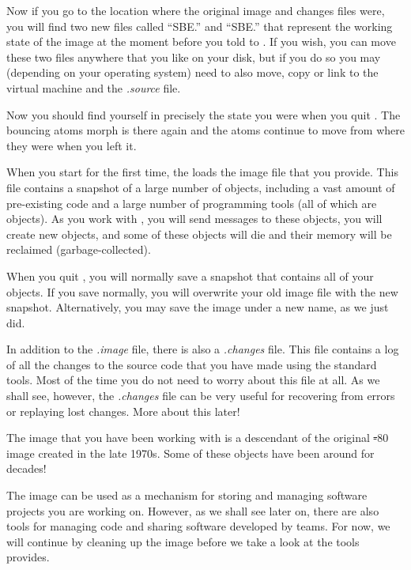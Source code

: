 \documentclass[a4paper,10pt,twoside]{book}
\begin{document}

Now if you go to the location where the original image and changes files were, you will find two new files called ``SBE.'' and ``SBE.'' that represent the working state of the \sq image at the moment before you told \sq to .
If you wish, you can move these two files anywhere that you like on your disk, but if you do so you may (depending on your operating system) need to also move, copy or link to the virtual machine and the \emph{.source} file.


Now you should find yourself in precisely the state you were when you quit \sq.
The bouncing atoms morph is there again and the atoms continue to move from where they were when you left it.

When you start \sq for the first time, the \sq {} loads the image file that you provide.
This file contains a snapshot of a large number of objects, including a vast amount of pre-existing code and a large number of programming tools (all of which are objects).
As you work with \sq, you will send messages to these objects, you will create new objects, and some of these objects will die and their memory will be reclaimed (\ie garbage-collected).

When you quit \sq, you will normally save a snapshot that contains all of your objects.
If you save normally, you will overwrite your old image file with the new snapshot.
Alternatively, you may save the image under a new name, as we just did.

In addition to the \emph{.image} file, there is also a \emph{.changes} file.
This file contains a log of all the changes to the source code that you have made using the standard tools.
Most of the time you do not need to worry about this file at all.
As we shall see, however, the \emph{.changes} file can be very useful for recovering from errors or replaying lost changes.
More about this later!

The image that you have been working with is a descendant of the original \st-80 image created in the late 1970s.
Some of these objects have been around for decades!

The image can be used as a mechanism for storing and managing software projects you are working on.
However, as we shall see later on, there are also tools for managing code and sharing software developed by teams.
For now, we will continue by cleaning up the image before we take a look at the tools \sq provides.
\end{document}
